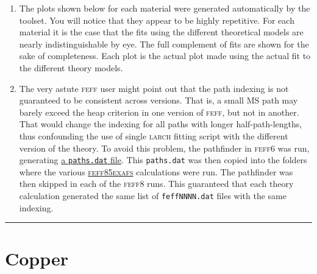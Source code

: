 \documentclass[11pt]{article}
\begin{document}
\begin{enumerate}
\item The plots shown below for each material were generated
  automatically by the toolset.  You will notice that they appear to
  be highly repetitive.  For each material it is the case that the
  fits using the different theoretical models are nearly
  indistinguishable by eye.  The full complement of fits are shown for
  the sake of completeness.  Each plot is the actual plot made using
  the actual fit to the different theory models.

\item The very astute \textsc{feff} user might point out that the path
  indexing is not guaranteed to be consistent across versions.  That
  is, a small MS path may barely exceed the heap criterion in one
  version of \textsc{feff}, but not in another.  That would change the
  indexing for all paths with longer half-path-lengths, thus
  confounding the use of single \textsc{larch} fitting script with the
  different version of the theory.  To avoid this problem, the
  pathfinder in \textsc{feff6} was run, generating
  \href{http://leonardo.phys.washington.edu/feff/wiki/static/f/e/f/FEFF_Program_control_1397.html}{a
    \texttt{paths.dat} file}.  This \texttt{paths.dat} was then copied
  into the folders where the various
  \href{https://github.com/xraypy/feff85exafs}{\textsc{feff85exafs}}
  calculations were run.  The pathfinder was then skipped in each of
  the \textsc{feff8} runs.  This guaranteed that each theory
  calculation generated the same list of \texttt{feffNNNN.dat} files
  with the same indexing.

\end{enumerate}

\rule{\linewidth}{0.5pt}

\section{Copper}
\label{sec:orgheadline7}
\end{document}
